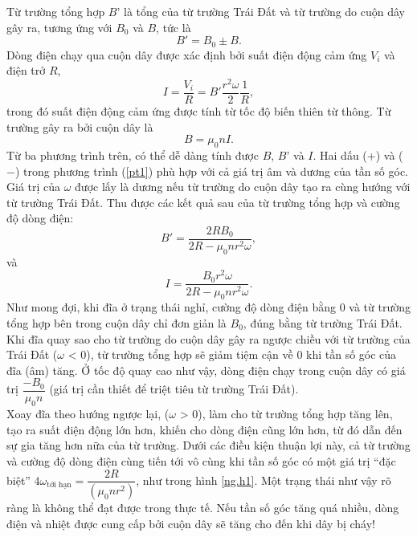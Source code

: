 \begin{loigiai}
Từ trường tổng hợp $B’$ là tổng của từ trường Trái Đất và từ trường do cuộn dây gây ra, tương ứng với $B_0$ và $B$, tức là
\[ B'=B_0\pm B. \tag{1} \label{pt1}\]
Dòng điện chạy qua cuộn dây được xác định bởi suất điện động cảm ứng $V_i$ và điện trở $R$,
	\[I=\dfrac{V_i}{R}=B'\dfrac{r^2\omega}{2}\dfrac{1}{R}, \tag{2}
	\label{pt2}\]
trong đó suất điện động cảm ứng được tính từ tốc độ biến thiên từ thông. Từ trường gây ra bởi cuộn dây là
	\[ B=\mu_0nI. \tag{3}
	\label{pt3}\] 
Từ ba phương trình trên, có thể dễ dàng tính được $B$, $B’$ và $I$. Hai dấu (+) và ($-$) trong phương trình (\ref{pt1}) phù hợp với cả giá trị âm và dương của tần số góc. Giá trị của  $\omega$ được lấy là dương nếu từ trường do cuộn dây tạo ra cùng hướng với từ trường Trái Đất. Thu được các kết quả sau của từ trường tổng hợp và cường độ dòng điện:
\[ B'=\dfrac{2R{B_0}}{2R-\mu_0n{r^2}\omega},\] 
và 
\[ I=\dfrac{B_0r^2\omega}{2R-\mu_0n{r^2}\omega}.\]
Như mong đợi, khi đĩa ở trạng thái nghỉ, cường độ dòng điện bằng $0$ và từ trường tổng hợp bên trong cuộn dây chỉ đơn giản là $B_0$, đúng bằng từ trường Trái Đất.\\
Khi đĩa quay sao cho từ trường do cuộn dây gây ra ngược chiều với từ trường của Trái Đất ($\omega$ < 0), từ trường tổng hợp sẽ giảm tiệm cận về $0$ khi tần số góc của đĩa (âm) tăng. Ở tốc độ quay cao như vậy, dòng điện chạy trong cuộn dây có giá trị $\dfrac{-B_0}{{\mu_0}n}$ (giá trị cần thiết để triệt tiêu từ trường Trái Đất).\\
Xoay đĩa theo hướng ngược lại, ($\omega$ > 0), làm cho từ trường tổng hợp tăng lên, tạo ra suất điện động lớn hơn, khiến cho dòng điện cũng lớn hơn, từ đó dẫn đến sự gia tăng hơn nữa của từ trường. Dưới các điều kiện thuận lợi này, cả từ trường và cường độ dòng điện cùng tiến tới vô cùng khi tần số góc có một giá trị “đặc biệt” 
$4\omega_{\text{tới hạn}}=\dfrac{2R}{\left(\mu_0n{r^2}\right)}$, như trong hình \ref{ng.h1}. Một trạng thái như vậy rõ ràng là không thể đạt được trong thực tế. Nếu tần số góc tăng quá nhiều, dòng điện và nhiệt được cung cấp bởi cuộn dây sẽ tăng cho đến khi dây bị cháy!
\begin{figure}[h!]
    \centering
    \begin{subfigure}{0.45\textwidth}
    \centering
    


\begin{tikzpicture}[x=0.75pt,y=0.75pt,yscale=-1,xscale=1]


\end{tikzpicture}
\end{subfigure}
\end{figure}
\end{loigiai}
